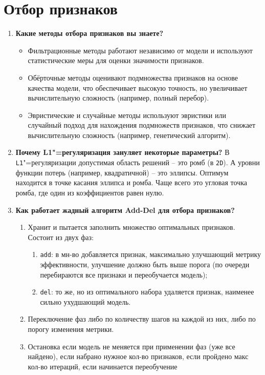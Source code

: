 \documentclass{article}
\begin{document}
\section{Отбор признаков}
\begin{enumerate}
    \item \textbf{Какие методы отбора признаков вы знаете?} 
    \begin{itemize}
        \item Фильтрационные методы работают независимо от модели и используют статистические меры для оценки значимости признаков.
        \item Обёрточные методы оценивают подмножества признаков на основе качества модели, что обеспечивает высокую точность, но увеличивает вычислительную сложность (например, полный перебор).
        \item Эвристические и случайные методы используют эвристики или случайный подход для нахождения подмножеств признаков, что снижает вычислительную сложность (например, генетический алгоритм).
    \end{itemize}
    \item \textbf{Почему L1"=регуляризация зануляет некоторые параметры?} В \texttt{L1}"=регуляризации допустимая область решений -- это ромб (в \texttt{2D}). А уровни функции потерь (например, квадратичной) -- это эллипсы. Оптимум находится в точке касания эллипса и ромба. Чаще всего это угловая точка ромба, где один из коэффициентов равен нулю.
    \item \textbf{Как работает жадный алгоритм Add-Del для отбора признаков?} 
    \begin{enumerate}
        \item Хранит и пытается заполнить множество оптимальных признаков. Состоит из двух фаз:
            \begin{enumerate}
                \item \texttt{add}: в мн-во добавляется признак, максимально улучшающий метрику эффективности, улучшение должно быть выше порога (по очереди перебираются все признаки и переобучается модель);
                \item \texttt{del}: то же, но из оптимального набора удаляется признак, наименее сильно ухудшающий модель.
            \end{enumerate}
        \item Переключение фаз либо по количеству шагов на каждой из них, либо по порогу изменения метрики. 
        \item Остановка если модель не меняется при применении фаз (уже все найдено), если набрано нужное кол-во признаков, если пройдено макс кол-во итераций, если начинается переобучение

\end{enumerate}
\end{enumerate}
\end{document}
